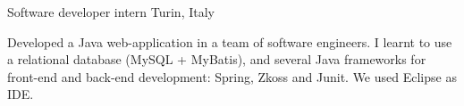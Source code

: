 \begin{cventries}
\cventry
{}%
{\vspace{-9mm}Software developer intern }
{\vspace{-9mm} \normalcolor Turin, Italy}
{}
{
\begin{cvitems}
Developed a Java web-application in a team of software engineers. I learnt 
to use a relational database (MySQL + MyBatis), and several Java frameworks for 
front-end and back-end development: Spring, Zkoss and Junit. We used Eclipse as 
IDE.
\end{cvitems}
}


\end{cventries}
